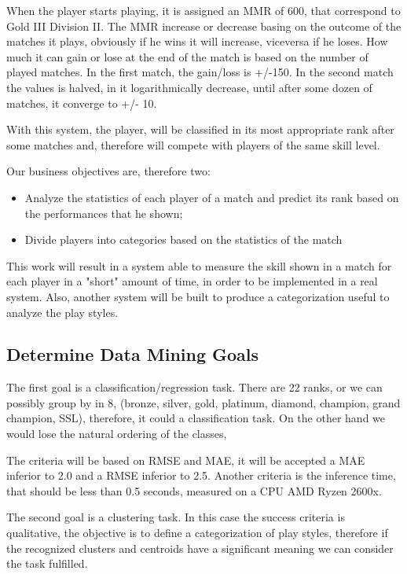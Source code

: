When the player starts playing, it is assigned an MMR of 600, that correspond to Gold III Division II. The MMR increase or decrease basing on the outcome of the matches it plays, obviously if he wins it will increase, viceversa if he loses. How much it can gain or lose at the end of the match is based on the number of played matches. In the first match, the gain/loss is +/-150. In the second match the values is halved, in it logarithmically decrease, until after some dozen of matches, it converge to +/- 10.

With this system, the player, will be classified in its most appropriate rank after some matches and, therefore will compete with players of the same skill level.

Our business objectives are, therefore two:
\begin{itemize}
    \item Analyze the statistics of each player of a match and predict its rank based on the performances that he shown;
    \item Divide players into categories based on the statistics of the match
\end{itemize}


This work will result in a system able to measure the skill shown in a match for each player in a "short" amount of time, in order to be implemented in a real system. Also, another system will be built to produce a categorization useful to analyze the play styles.

\subsection{Determine Data Mining Goals}
\label{sec:min_goal}
The first goal is a classification/regression task. There are 22 ranks, or we can possibly group by in 8, (bronze, silver, gold, platinum, diamond, champion, grand champion, SSL), therefore, it could a classification task. On the other hand we would lose the natural ordering of the classes, 

The criteria will be based on RMSE and MAE, it will be accepted a MAE inferior to 2.0 and a RMSE inferior to 2.5. 
Another criteria is the inference time, that should be less than 0.5 seconds, measured on a CPU AMD Ryzen 2600x.

The second goal is a clustering task. In this case the success criteria is qualitative, the objective is to define a categorization of play styles, therefore if the recognized clusters and centroids have a significant meaning we can consider the task fulfilled.